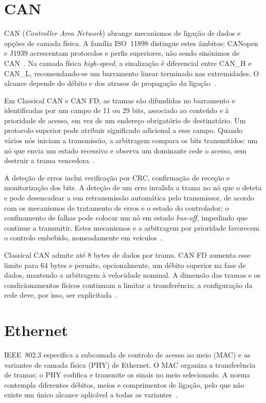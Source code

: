 \section{CAN}

CAN (\textit{Controller Area Network}) abrange mecanismos de ligação de
dados e opções de camada física. A família ISO~11898 distingue estes
âmbitos; CANopen e J1939 acrescentam protocolos e perfis superiores,
não sendo sinónimos de CAN~\cite{cia_can_standardization}.
Na camada física \textit{high-speed}, a sinalização é diferencial entre
CAN\_H e CAN\_L, recomendando-se um barramento linear terminado nas
extremidades. O alcance depende do débito e dos atrasos de propagação
da ligação~\cite{cia_can_hs}.

Em Classical CAN e CAN FD, as tramas são difundidas no barramento e identificadas por um campo de
11 ou 29 bits, associado ao conteúdo e à prioridade de acesso, em vez
de um endereço obrigatório de destinatário. Um protocolo superior pode
atribuir significado adicional a esse campo. Quando vários nós iniciam
a transmissão, a arbitragem compara os bits transmitidos: um nó que
envia um estado recessivo e observa um dominante cede o acesso, sem
destruir a trama vencedora~\cite{cia_can_cc}.

A deteção de erros inclui verificação por CRC, confirmação de receção
e monitorização dos bits. A deteção de um erro invalida a trama no nó
que o deteta e pode desencadear a sua retransmissão automática pelo
transmissor, de acordo com os mecanismos de tratamento de erros e o
estado do controlador; o confinamento de falhas pode colocar um nó em estado
\textit{bus-off}, impedindo que continue a transmitir. Estes mecanismos
e a arbitragem por prioridade favorecem o controlo embebido,
nomeadamente em veículos~\cite{cia_can_cc}.

Classical CAN admite até 8 bytes de dados por trama. CAN FD aumenta
esse limite para 64 bytes e permite, opcionalmente, um débito superior
na fase de dados, mantendo a arbitragem à velocidade nominal.
A dimensão das tramas e os condicionamentos físicos continuam a limitar
a transferência; a configuração da rede deve, por isso, ser
explicitada~\cite{cia_can_fd,cia_can_hs}.

\section{Ethernet}

IEEE~802.3 especifica a subcamada de controlo de acesso ao meio (MAC) e
as variantes de camada física (PHY) de Ethernet. O MAC organiza a
transferência de tramas; o PHY codifica e transmite os sinais no meio
selecionado. A norma contempla diferentes débitos, meios e comprimentos
de ligação, pelo que não existe um único alcance aplicável a todas
as variantes~\cite{ieee_8023_2018}.

